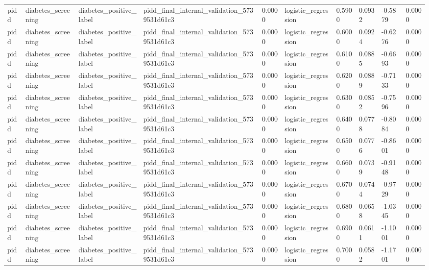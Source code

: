 \begin{tabular}{llllllllll}
pidd & diabetes\_screening & diabetes\_positive\_label & pidd\_final\_internal\_validation\_5739531d61c3 & 0.0000 & logistic\_regression & 0.5900 & 0.0932 & -0.5879 & 0.0000 \\
pidd & diabetes\_screening & diabetes\_positive\_label & pidd\_final\_internal\_validation\_5739531d61c3 & 0.0000 & logistic\_regression & 0.6000 & 0.0924 & -0.6276 & 0.0000 \\
pidd & diabetes\_screening & diabetes\_positive\_label & pidd\_final\_internal\_validation\_5739531d61c3 & 0.0000 & logistic\_regression & 0.6100 & 0.0885 & -0.6693 & 0.0000 \\
pidd & diabetes\_screening & diabetes\_positive\_label & pidd\_final\_internal\_validation\_5739531d61c3 & 0.0000 & logistic\_regression & 0.6200 & 0.0889 & -0.7133 & 0.0000 \\
pidd & diabetes\_screening & diabetes\_positive\_label & pidd\_final\_internal\_validation\_5739531d61c3 & 0.0000 & logistic\_regression & 0.6300 & 0.0852 & -0.7596 & 0.0000 \\
pidd & diabetes\_screening & diabetes\_positive\_label & pidd\_final\_internal\_validation\_5739531d61c3 & 0.0000 & logistic\_regression & 0.6400 & 0.0778 & -0.8084 & 0.0000 \\
pidd & diabetes\_screening & diabetes\_positive\_label & pidd\_final\_internal\_validation\_5739531d61c3 & 0.0000 & logistic\_regression & 0.6500 & 0.0776 & -0.8601 & 0.0000 \\
pidd & diabetes\_screening & diabetes\_positive\_label & pidd\_final\_internal\_validation\_5739531d61c3 & 0.0000 & logistic\_regression & 0.6600 & 0.0739 & -0.9148 & 0.0000 \\
pidd & diabetes\_screening & diabetes\_positive\_label & pidd\_final\_internal\_validation\_5739531d61c3 & 0.0000 & logistic\_regression & 0.6700 & 0.0744 & -0.9729 & 0.0000 \\
pidd & diabetes\_screening & diabetes\_positive\_label & pidd\_final\_internal\_validation\_5739531d61c3 & 0.0000 & logistic\_regression & 0.6800 & 0.0658 & -1.0345 & 0.0000 \\
pidd & diabetes\_screening & diabetes\_positive\_label & pidd\_final\_internal\_validation\_5739531d61c3 & 0.0000 & logistic\_regression & 0.6900 & 0.0611 & -1.1001 & 0.0000 \\
pidd & diabetes\_screening & diabetes\_positive\_label & pidd\_final\_internal\_validation\_5739531d61c3 & 0.0000 & logistic\_regression & 0.7000 & 0.0582 & -1.1701 & 0.0000 \\

\end{tabular}
